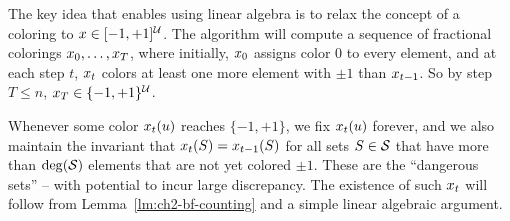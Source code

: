  The key idea that enables using linear algebra is to relax the concept of a coloring to  $x \in [-1,+1]^{\mathcal{U}}$. The algorithm will compute a sequence of fractional colorings $x_0, \ldots, x_T$,
 where initially, $x_0$ assigns color $0$ to every element, and at each step $t$, $x_t$ colors at least one more element with $\pm 1$ than $x_{t-1}$. So by step $T \le n$, $x_T \in \{-1,+1\}^{\mathcal{U}}$.
 
 Whenever some color $x_t(u)$ reaches $\{-1,+1\}$, we fix $x_t(u)$ forever, and we also maintain the invariant that $x_t(S) = x_{t-1}(S)$ for all sets $S \in \mathcal{S}$ that have more than $\operatorname{deg}(\mathcal{S})$ elements that are not yet colored $\pm 1$. These are the ``dangerous sets'' -- with potential to incur large discrepancy. %
 The existence of such $x_t$ will follow from Lemma~\ref{lm:ch2-bf-counting} and a simple linear algebraic argument.




